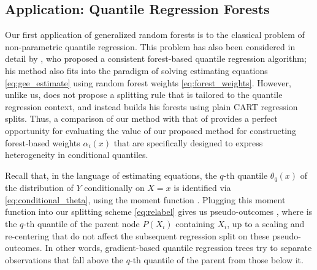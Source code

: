 \documentclass[aos]{imsart}
\theoremstyle{plain}
\theoremstyle{definition}
\theoremstyle{remark}
\begin{document}
\begin{CJK}{UTF8}{gbsn}
{\section{Application: Quantile Regression Forests}
\label{sec:quantile}

Our first application of generalized random forests is to the classical problem of non-parametric quantile regression.
This problem has also been considered in detail by
\citet{meinshausen2006quantile}, who proposed a consistent forest-based quantile regression
algorithm; his method also fits into the paradigm of solving estimating equations \eqref{eq:gee_estimate}
using random forest weights \eqref{eq:forest_weights}. However, unlike us, \citet{meinshausen2006quantile}
does not propose a splitting rule that is tailored to the quantile regression context, and instead
builds his forests using plain CART regression splits. Thus, a comparison of our method with that of
\citet{meinshausen2006quantile} provides a perfect opportunity for evaluating the value of our
proposed method for constructing forest-based weights $\alpha_i(x)$ that are specifically designed
to express heterogeneity in conditional quantiles.

Recall that, in the language of estimating equations, the $q$-th quantile $\theta_q(x)$
of the distribution of $Y$ conditionally on $X = x$ is identified via \eqref{eq:conditional_theta}, 
using the moment function
.
Plugging this moment function into our splitting scheme \eqref{eq:relabel} gives us pseudo-outcomes
, where  is the $q$-th quantile of the parent node $P(X_i)$
containing $X_i$,
up to a scaling and re-centering that do not affect the subsequent regression split on these
pseudo-outcomes.
In other words, gradient-based quantile regression trees try to separate observations that
fall above the $q$-th quantile of the parent from those below it.

}
\end{CJK}
\end{document}
